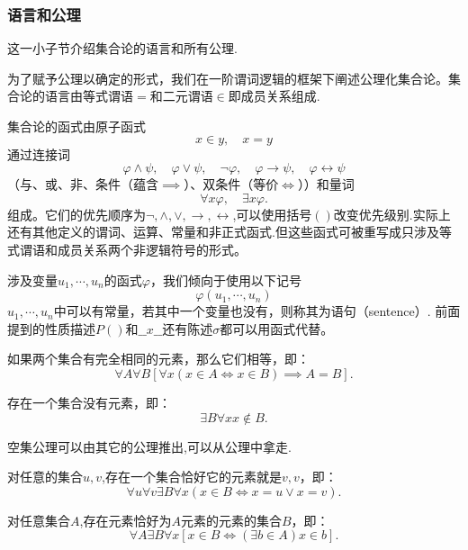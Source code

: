 \subsubsection{语言和公理}

这一小子节介绍集合论的语言和所有公理.

为了赋予公理以确定的形式，我们在一阶谓词逻辑的框架下阐述公理化集合论。集合论的语言由等式谓语$=$和二元谓语$\in$即成员关系组成.

集合论的函式由原子函式
\[x\in y,\quad x=y\]
通过连接词
\[\varphi\wedge\psi ,\quad\varphi\vee\psi ,
\quad\neg\varphi ,
\quad\varphi\rightarrow\psi ,
\quad\varphi\leftrightarrow\psi\]
（与、或、非、条件（蕴含$\implies$）、双条件（等价$\iff$））和量词
\[\forall x\varphi,\quad\exists x\varphi.\]组成。它们的优先顺序为$\neg,\wedge,\vee,\rightarrow,\leftrightarrow$,可以使用括号$()$改变优先级别.实际上还有其他定义的谓词、运算、常量和非正式函式.但这些函式可被重写成只涉及等式谓语和成员关系两个非逻辑符号的形式。

涉及变量$u_1,\cdots,u_n$的函式$\varphi$，我们倾向于使用以下记号
\[\varphi(u_1,\cdots,u_n)\]
$u_1,\cdots,u_n$中可以有常量，若其中一个变量也没有，则称其为语句（sentence）.
前面提到的性质描述$P()$和$\_\_x\_\_$还有陈述$\sigma$都可以用函式代替。
\begin{axiom}
如果两个集合有完全相同的元素，那么它们相等，即：
\[\forall A\forall B[\forall x(x\in A\iff x\in B)\implies A=B].\]
\end{axiom}

\begin{axiom}
    存在一个集合没有元素，即：
    \[\exists B\forall x x\notin B.\]
\end{axiom}

\begin{note}
    空集公理可以由其它的公理推出,可以从公理中拿走.
\end{note}

\begin{axiom}
    对任意的集合$u,v$,存在一个集合恰好它的元素就是$v,v$，即：
    \[\forall u\forall v\exists B\forall x(x\in B\iff x=u\vee x=v).\]
\end{axiom}

\begin{axiom}
    对任意集合$A$,存在元素恰好为$A$元素的元素的集合$B$，即：
    \[\forall A\exists B\forall x[x\in B\iff (\exists b\in A)x\in b].\]
\end{axiom}

